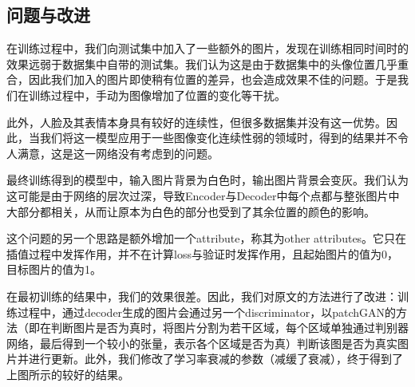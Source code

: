 \documentclass[UTF8,a4paper，12pt]{article}
\theoremstyle{theorem}
\theoremstyle{definition}
\begin{document}
\subsection{问题与改进}

在训练过程中，我们向测试集中加入了一些额外的图片，发现在训练相同时间时的效果远弱于数据集中自带的测试集。我们认为这是由于数据集中的头像位置几乎重合，因此我们加入的图片即使稍有位置的差异，也会造成效果不佳的问题。于是我们在训练过程中，手动为图像增加了位置的变化等干扰。

此外，人脸及其表情本身具有较好的连续性，但很多数据集并没有这一优势。因此，当我们将这一模型应用于一些图像变化连续性弱的领域时，得到的结果并不令人满意，这是这一网络没有考虑到的问题。

最终训练得到的模型中，输入图片背景为白色时，输出图片背景会变灰。我们认为这可能是由于网络的层次过深，导致Encoder与Decoder中每个点都与整张图片中大部分都相关，从而让原本为白色的部分也受到了其余位置的颜色的影响。

这个问题的另一个思路是额外增加一个attribute，称其为other attributes。它只在插值过程中发挥作用，并不在计算loss与验证时发挥作用，且起始图片的值为0，目标图片的值为1。

在最初训练的结果中，我们的效果很差。因此，我们对原文的方法进行了改进：训练过程中，通过decoder生成的图片会通过另一个discriminator，以patchGAN的方法（即在判断图片是否为真时，将图片分割为若干区域，每个区域单独通过判别器网络，最后得到一个较小的张量，表示各个区域是否为真）判断该图是否为真实图片并进行更新。此外，我们修改了学习率衰减的参数（减缓了衰减），终于得到了上图所示的较好的结果。
\end{document}

